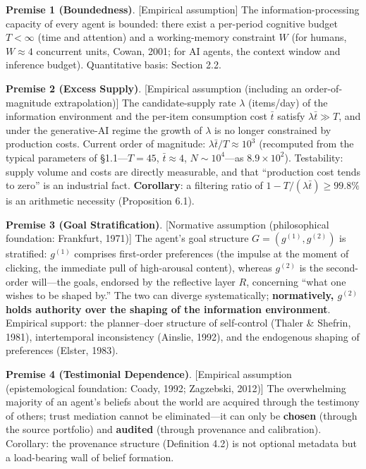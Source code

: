 \documentclass[
  11pt]{article}
\begin{document}
\textbf{Premise 1 (Boundedness)}. {[}Empirical assumption{]} The
information-processing capacity of every agent is bounded: there exist a
per-period cognitive budget \(T < \infty\) (time and attention) and a
working-memory constraint \(W\) (for humans, \(W \approx 4\) concurrent
units, Cowan, 2001; for AI agents, the context window and inference
budget). Quantitative basis: Section 2.2.

\textbf{Premise 2 (Excess Supply)}. {[}Empirical assumption (including
an order-of-magnitude extrapolation){]} The candidate-supply rate
\(\lambda\) (items/day) of the information environment and the per-item
consumption cost \(\bar t\) satisfy \(\lambda \bar t \gg T\), and under
the generative-AI regime the growth of \(\lambda\) is no longer
constrained by production costs. Current order of magnitude:
\(\lambda \bar t / T \approx 10^3\) (recomputed from the typical
parameters of §1.1---\(T=45\), \(\bar t\approx4\), \(N\sim10^4\)---as
\(8.9\times10^2\)). Testability: supply volume and costs are directly
measurable, and that ``production cost tends to zero'' is an industrial
fact. \textbf{Corollary}: a filtering ratio of
\(1 - T/(\lambda \bar t) \ge 99.8\%\) is an arithmetic necessity
(Proposition 6.1).

\textbf{Premise 3 (Goal Stratification)}. {[}Normative assumption
(philosophical foundation: Frankfurt, 1971){]} The agent's goal
structure \(G = (g^{(1)}, g^{(2)})\) is stratified: \(g^{(1)}\)
comprises first-order preferences (the impulse at the moment of
clicking, the immediate pull of high-arousal content), whereas
\(g^{(2)}\) is the second-order will---the goals, endorsed by the
reflective layer \(R\), concerning ``what one wishes to be shaped by.''
The two can diverge systematically; \textbf{normatively, \(g^{(2)}\)
holds authority over the shaping of the information environment}.
Empirical support: the planner--doer structure of self-control (Thaler
\& Shefrin, 1981), intertemporal inconsistency (Ainslie, 1992), and the
endogenous shaping of preferences (Elster, 1983).

\textbf{Premise 4 (Testimonial Dependence)}. {[}Empirical assumption
(epistemological foundation: Coady, 1992; Zagzebski, 2012){]} The
overwhelming majority of an agent's beliefs about the world are acquired
through the testimony of others; trust mediation cannot be
eliminated---it can only be \textbf{chosen} (through the source
portfolio) and \textbf{audited} (through provenance and calibration).
Corollary: the provenance structure (Definition 4.2) is not optional
metadata but a load-bearing wall of belief formation.
\end{document}
